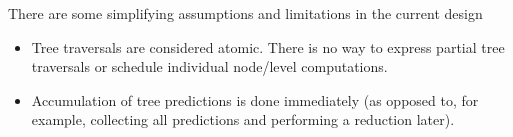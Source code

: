 There are some simplifying assumptions and limitations in the current design
\begin{itemize}
  \item Tree traversals are considered atomic. There is no way to express partial
   tree traversals or schedule individual node/level computations. 
  \item Accumulation of tree predictions is done immediately (as opposed to, 
  for example, collecting all predictions and performing a reduction later).
\end{itemize}
